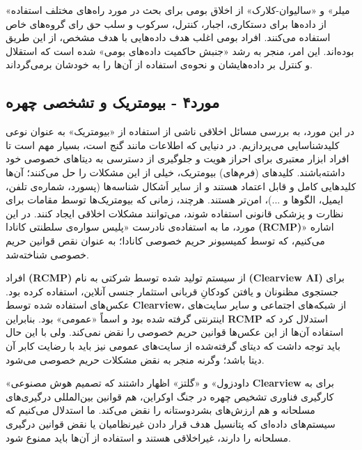 «میلر» و «سالیوان-کلارک» از اخلاق بومی برای بحث در مورد راه‌های مختلف استفاده از داده‌ها برای دستکاری، اجبار، کنترل، سرکوب و سلب حق رای گروه‌های خاص استفاده می‌کنند.
افراد بومی اغلب هدف داده‌هایی با هدف مشخص، از این طریق بوده‌اند.
این امر، منجر به رشد «جنبش حاکمیت داده‌های بومی» شده است که استقلال و کنترل بر داده‌هایشان و نحوه‌ی استفاده از آن‌ها را به خودشان برمی‌گرداند.
\newline
\newline

{
\subsection*{مورد۴ - بیومتریک و تشخصی چهره}
\label{subsec:مورد۴ - بیومتریک و تشخصی چهره}
در این مورد، به بررسی مسائل اخلاقی ناشی از استفاده از «بیومتریک» به عنوان نوعی کلیدشناسایی می‌پردازیم.
در دنیایی که اطلاعات مانند گنج است، بسیار مهم است تا افراد ابزار معتبری برای احراز هویت و جلوگیری از دسترسی به دیتاهای خصوصی خود داشته‌باشند.
کلید‌های (فرم‌های) بیومتریک، خیلی از این مشکلات را حل می‌کنند؛ آن‌ها کلیدهایی کامل و قابل اعتماد هستند و از سایر اَشکال شناسه‌ها (پسورد، شماره‌ی تلفن، ایمیل، الگوها و ...)، امن‌تر هستند.
هرچند، زمانی که بیومتریک‌ها توسط مقامات برای نظارت و پزشکی قانونی استفاده شوند، می‌توانند مشکلات اخلاقی ایجاد کنند.
در این مورد، ما به استفاده‌ی نادرست «پلیس سواره‌ی سلطنتی کانادا \textenglish{\textbf{(RCMP)}}» اشاره می‌کنیم، که توسط کمیسیونر حریم خصوصی کانادا؛ به عنوان نقص قوانین حریم خصوصی شناخته‌شد.
}

افراد \textenglish{\textbf{(RCMP)}} از سیستم تولید شده توسط شرکتی به نام \textenglish{\textbf{(Clearview AI)}} برای جستجوی مظنونان و یافتن کودکانِ قربانی استثمار جنسی آنلاین، استفاده کرده بود.
عکس‌های استفاده شده توسط \textenglish{\textbf{Clearview}}، از شبکه‌های اجتماعی و سایر سایت‌های اینترنتی گرفته شده بود و اسماً «عمومی» بود.
بنابراین \textenglish{\textbf{RCMP}} استدلال کرد که استفاده آن‌ها از این عکس‌ها قوانین حریم خصوصی را نقض نمی‌کند.
ولی با این حال باید توجه داشت که دیتای گرفته‌شده از سایت‌های عمومی نیز باید با رضایت کابر آن دیتا باشد؛ وگرنه منجر به نقض مشکلات حریم خصوصی می‌شود.

«داودزول» و «گلتز» اظهار داشتند که تصمیم هوش مصنوعی \textenglish{\textbf{Clearview}} برای به کارگیری فناوری تشخیص چهره در جنگ اوکراین، هم قوانین بین‌المللی درگیری‌های مسلحانه و هم ارزش‌های بشردوستانه را نقض می‌کند.
ما استدلال می‌کنیم که سیستم‌های داده‌ای که پتانسیل هدف قرار دادن غیرنظامیان یا نقض قوانین درگیری مسلحانه را دارند، غیراخلاقی هستند و استفاده از آن‌ها باید ممنوع شود.

